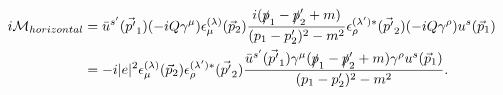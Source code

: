 \begin{example}
\begin{equation}
\begin{split}
		\end{split}
		\label{M1}
	\end{equation} 
	\begin{equation}
		\begin{split}
			i\mathcal{M}_{horizontal}&=\bar{u}^{s'}(\vec{p'}_1)(-iQ\gamma^\mu)\epsilon^{(\lambda)}_{\mu}(\vec{p}_2)\frac{i(\slashed p_1-\slashed p'_2+m)}{(p_1-p'_2)^2-m^2}\epsilon^{(\lambda')*}_{\rho}(\vec{p'}_2)(-iQ\gamma^\rho)
			u^s(\vec{p}_1)\\
			&=-i|e|^2\epsilon^{(\lambda)}_{\mu}(\vec{p}_2)\epsilon^{(\lambda')*}_{\rho}(\vec{p'}_2)\frac{\bar{u}^{s'}(\vec{p'}_1)\gamma^\mu(\slashed p_1-\slashed p'_2+m)\gamma^\rho
				u^s(\vec{p}_1)}{(p_1-p'_2)^2-m^2}.
		\end{split}
		\label{M2}
	\end{equation} 
	
\end{example}


